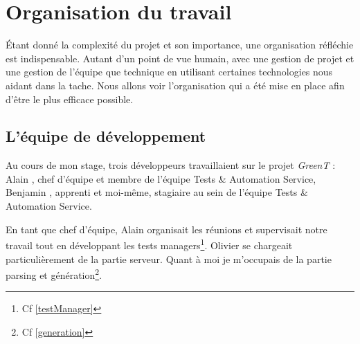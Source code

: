 \chapter{Organisation du travail}\label{chapOrganization}
\putminitoc \'Etant donné la complexité du projet et son importance, une organisation réfléchie est indispensable. Autant d'un point de vue humain, avec une gestion de projet et une gestion de l'équipe que technique en utilisant certaines technologies nous aidant dans la tache.  Nous allons voir l'organisation qui a été mise en place afin d'être le plus efficace possible.
\vspace{-32px}

\section{L'équipe de développement}
Au cours de mon stage, trois développeurs travaillaient sur le projet \textit{GreenT} : Alain , chef d’équipe et membre de
l’équipe Tests \& Automation Service, Benjamin , apprenti et moi-même, stagiaire au sein de l’équipe Tests \& Automation Service.

En tant que chef d’équipe, Alain  organisait les réunions et supervisait notre travail tout en développant les tests managers\footnote{Cf \ref{testManager}}. Olivier  se chargeait particulièrement de la partie serveur. Quant à moi je m’occupais de la partie parsing et génération\footnote{Cf \ref{generation}}.



